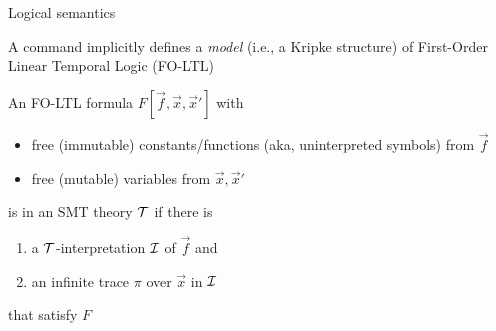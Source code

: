 \documentclass[10pt,aspectratio=149]{beamer}
\begin{document}

\begin{frame}{Logical semantics}

A  command implicitly defines 
a \emph{model} (i.e., a Kripke structure) 
of \alert{First-Order} Linear Temporal Logic (FO-LTL)
\bigskip
\pause

An FO-LTL formula $F[\vec f, \vec x, \vec x']$ with 
\smallskip

\begin{itemize}
\item free (immutable) constants/functions (aka, uninterpreted symbols) from $\vec f$ 
\item free (mutable) variables from $\vec x, \vec x'$ 
\end{itemize}
\smallskip

is  in an SMT theory $\mathcal{T}$ if there is
\smallskip
\pause

\begin{enumerate}
\item a $\mathcal{T}$-interpretation $\mathcal{I}$ of $\vec f$ and 
\item an infinite trace $\pi$ over $\vec x$ in $\mathcal{I}$
\end{enumerate}
\smallskip

that \alert{satisfy} $F$

\end{frame}

\end{document}
